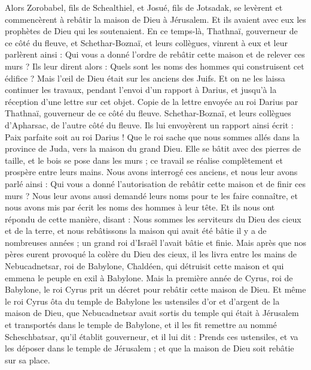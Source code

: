 \begin{multicols}{2}
Alors Zorobabel, fils de Schealthiel, et Josué, fils de Jotsadak, se levèrent et commencèrent à rebâtir la maison de Dieu à Jérusalem. Et ils avaient avec eux les prophètes de Dieu qui les soutenaient.
En ce temps-là, Thathnaï, gouverneur de ce côté du fleuve, et Schethar-Boznaï, et leurs collègues, vinrent à eux et leur parlèrent ainsi : Qui vous a donné l’ordre de rebâtir cette maison et de relever ces murs ?
Ils leur dirent alors : Quels sont les noms des hommes qui construisent cet édifice ?
Mais l’œil de Dieu était sur les anciens des Juifs. Et on ne les laissa continuer les travaux, pendant l’envoi d’un rapport à Darius, et jusqu'à la réception d’une lettre sur cet objet.
Copie de la lettre envoyée au roi Darius par Thathnaï, gouverneur de ce côté du fleuve. Schethar-Boznaï, et leurs collègues d'Apharsac, de l’autre côté du fleuve.
Ils lui envoyèrent un rapport ainsi écrit : Paix parfaite soit au roi Darius !
Que le roi sache que nous sommes allés dans la province de Juda, vers la maison du grand Dieu. Elle se bâtit avec des pierres de taille, et le bois se pose dans les murs ; ce travail se réalise complètement et prospère entre leurs mains.
Nous avons interrogé ces anciens, et nous leur avons parlé ainsi : Qui vous a donné l'autorisation de rebâtir cette maison et de finir ces murs ?
Nous leur avons aussi demandé leurs noms pour te les faire connaître, et nous avons mis par écrit les noms des hommes à leur tête.
Et ils nous ont répondu de cette manière, disant : Nous sommes les serviteurs du Dieu des cieux et de la terre, et nous rebâtissons la maison qui avait été bâtie il y a de nombreuses années ; un grand roi d'Israël l’avait bâtie et finie.
Mais après que nos pères eurent provoqué la colère du Dieu des cieux, il les livra entre les mains de Nebucadnetsar, roi de Babylone, Chaldéen, qui détruisit cette maison et qui emmena le peuple en exil à Babylone.
Mais la première année de Cyrus, roi de Babylone, le roi Cyrus prit un décret pour rebâtir cette maison de Dieu.
Et même le roi Cyrus ôta du temple de Babylone les ustensiles d'or et d'argent de la maison de Dieu, que Nebucadnetsar avait sortis du temple qui était à Jérusalem et transportés dans le temple de Babylone, et il les fit remettre au nommé Scheschbatsar, qu’il établit gouverneur,
et il lui dit : Prends ces ustensiles, et va les déposer dans le temple de Jérusalem ; et que la maison de Dieu soit rebâtie sur sa place.

\end{multicols}
